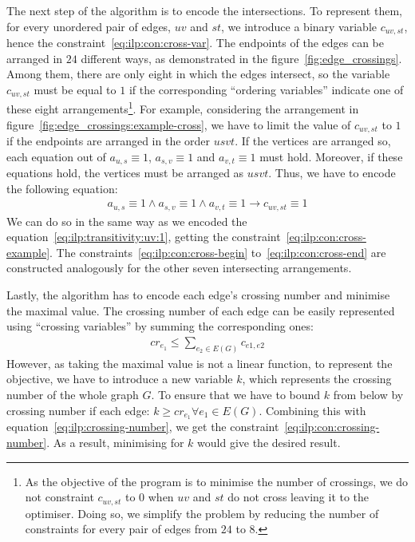 The next step of the algorithm is to encode the intersections. To represent them, for every unordered pair of edges, \(uv\) and \(st\), we introduce a binary variable \(c_{uv, st}\), hence the constraint~\eqref{eq:ilp:con:cross-var}. The endpoints of the edges can be arranged in \(24\) different ways, as demonstrated in the figure~\ref{fig:edge_crossings}. Among them, there are only eight in which the edges intersect, so the variable \(c_{uv, st}\) must be equal to \(1\) if the corresponding ``ordering variables'' indicate one of these eight arrangements\footnote{As the objective of the program is to minimise the number of crossings, we do not constraint \(c_{uv, st}\) to \(0\) when \(uv\) and \(st\) do not cross leaving it to the optimiser. Doing so, we simplify the problem by reducing the number of constraints for every pair of edges from \(24\) to \(8\).}. For example, considering the arrangement in figure~\ref{fig:edge_crossings:example-cross}, we have to limit the value of \(c_{uv, st}\) to \(1\) if the endpoints are arranged in the order \(usvt\). If the vertices are arranged so, each equation out of \(a_{u,s} \equiv 1\), \(a_{s,v} \equiv 1\) and \(a_{v,t} \equiv 1\) must hold. Moreover, if these equations hold, the vertices must be arranged as \(usvt\). Thus, we have to encode the following equation:
\begin{align*}
    a_{u,s} \equiv 1 \land a_{s,v} \equiv 1 \land a_{v,t} \equiv 1 \longrightarrow c_{uv, st} \equiv 1
\end{align*}
We can do so in the same way as we encoded the equation~\eqref{eq:ilp:transitivity:uv:1}, getting the constraint~\eqref{eq:ilp:con:cross-example}. The constraints~\eqref{eq:ilp:con:cross-begin} to~\eqref{eq:ilp:con:cross-end} are constructed analogously for the other seven intersecting arrangements.

Lastly, the algorithm has to encode each edge's crossing number and minimise the maximal value. The crossing number of each edge can be easily represented using ``crossing variables'' by summing the corresponding ones:
\begin{align}
    \label{eq:ilp:crossing-number}
    cr_{e_1} \leqslant \sum_{e_2 \in E(G)} c_{e1, e2}
\end{align}
However, as taking the maximal value is not a linear function, to represent the objective, we have to introduce a new variable \(k\), which represents the crossing number of the whole graph \(G\). To ensure that we have to bound \(k\) from below by crossing number if each edge: \(k \geqslant cr_{e_1} \forall e_1 \in E(G)\). Combining this with equation~\eqref{eq:ilp:crossing-number}, we get the constraint~\eqref{eq:ilp:con:crossing-number}. As a result, minimising for \(k\) would give the desired result.

